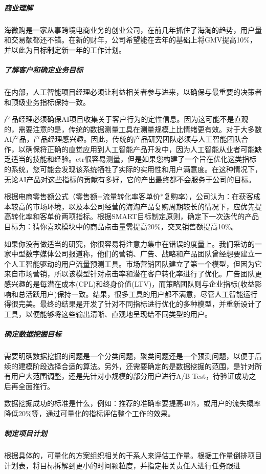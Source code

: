 \documentclass[letterpaper,11pt,english]{sphinxmanual}
\begin{document}
\subparagraph{商业理解}
\label{\detokenize{chapter_project/process:id14}}
海微购是一家从事跨境电商业务的创业公司，在前几年抓住了海淘的趋势，用户量和交易额都还不错。在新的财年，公司希望能在去年的基础上将GMV提高10\%，并以此为目标制定新一年的工作计划。


\subparagraph{了解客户和确定业务目标}
\label{\detokenize{chapter_project/process:id15}}
在内部，人工智能项目经理必须让利益相关者参与进来，以确保与最重要的决策者和顶级业务指标保持一致。

产品经理必须确保AI项目收集关于客户行为的定性信息。因为这可能不是直观的，需要注意的是，传统的数据测量工具在测量规模上比情绪更有效。对于大多数AI产品，产品经理感兴趣。因此，传统的产品研究团队必须与人工智能团队合作，以确保将正确的直觉应用到人工智能产品开发中，因为人工智能从业者可能缺乏适当的技能和经验。ctr很容易测量，但是如果您构建了一个旨在优化这类指标的系统，您可能会发现该系统牺牲了实际的实用性和用户满意度。在这种情况下，无论AI产品对这些指标的贡献有多好，它的产出最终都不会服务于公司的目标。

根据电商零售额公式（零售额=流量转化率客单价*复购率），公司认为：在获客成本较高的市场环境，以及本公司经营的海淘产品复购周期较长的情况下，应优先提高转化率和客单价两项指标。根据SMART目标制定原则，确定下一次迭代的产品目标为：猜你喜欢模块中的商品点击量需提高20\%，交叉销售额提高10\%。

如果你没有做适当的研究，你很容易将注意力集中在错误的度量上。我们采访的一家中型数字媒体公司报道称，他们的营销、广告、战略和产品团队曾经想要建立一个人工智能驱动的用户流量预测工具。市场营销团队建立了第一个模型，但因为它来自市场营销，所以该模型针对点击率和潜在客户转化率进行了优化。广告团队更感兴趣的是每潜在成本(CPL)和终身价值(LTV)，而策略团队则与企业指标(收益影响和总活跃用户)保持一致。结果，很多工具的用户都不满意，尽管人工智能运行得很完美。最终的结果是开发了针对不同指标进行优化的多种模型，并重新设计了工具，以便能够将这些输出清晰、直观地呈现给不同类型的用户。


\subparagraph{确定数据挖掘目标}
\label{\detokenize{chapter_project/process:id16}}
需要明确数据挖掘的问题是一个分类问题，聚类问题还是一个预测问题，以便于后续的建模阶段选择合适的算法。另外，还需要确定的是数据挖掘的范围，是针对所有用户大范围调整，还是先针对小规模的部分用户进行A/B
Test，待验证成功之后再全面推行。

数据挖掘成功的标准是什么，例如：推荐的准确率要提高40\%，或用户的流失概率降低20\%等，通过可量化的指标评估整个工作的效果。


\subparagraph{制定项目计划}
\label{\detokenize{chapter_project/process:id17}}
根据具体的，可量化的方案组织相关的干系人来评估工作量。根据工作量倒排项目计划表，将目标拆解到更小的时间颗粒度，并指定相关责任人进行任务跟进
\end{document}
